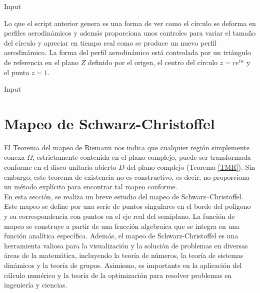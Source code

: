\begin{mmaCell}[moregraphics={moreig={scale=0.6}}]{Input}
\end{mmaCell}


Lo  que el script anterior genera es una forma de ver como el círculo se deforma en perfiles aerodinámicos y además proporciona unos controles para variar el tamaño del círculo y apreciar en tiempo real como se produce un nuevo perfil aerodinámico. La forma del perfil aerodinámico está controlada por un triángulo de referencia en el plano $Z$ definido por el origen, el centro del círculo  $z=re^{i\alpha}$ y el punto $z=1$.
\begin{mmaCell}[moregraphics={moreig={scale=0.6}}]{Input}
\end{mmaCell}




\section{Mapeo de Schwarz-Christoffel}

El Teorema del mapeo de Riemann nos indica que cualquier región simplemente conexa $\Omega$, estrictamente contenida en el plano complejo, puede ser transformada conforme en el disco unitario abierto $D$ del plano complejo (Teorema \ref{TMR}). Sin embargo, este teorema de existencia no es constructivo, es decir, no proporciona un método explícito para encontrar tal mapeo conforme.\\

En esta sección, se realiza un breve estudio del mapeo de Schwarz–Christoffel. Este mapeo se define por una serie de puntos singulares en el borde del polígono y su correspondencia con puntos en el eje real del semiplano. La función de mapeo se construye a partir de una fracción algebraica que se integra en una función analítica específica. Además, el mapeo de Schwarz-Christoffel es una herramienta valiosa para la visualización y la solución de problemas en diversas áreas de la matemática, incluyendo la teoría de números, la teoría de sistemas dinámicos y la teoría de grupos. Asimismo, es importante en la aplicación del cálculo numérico y la teoría de la optimización para resolver problemas en ingeniería y ciencias.\\

